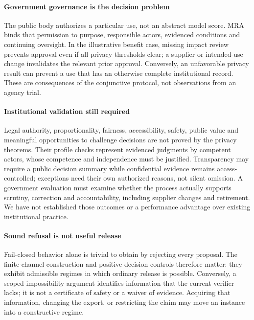 \documentclass[conference,compsoc]{IEEEtran}
\begin{document}
\paragraph{Government governance is the decision problem}
The public body authorizes a particular use, not an abstract model score.
MRA binds that permission to purpose, responsible actors, evidenced
conditions and continuing oversight. In the illustrative benefit case,
missing impact review prevents approval even if all privacy thresholds
clear; a supplier or intended-use change invalidates the relevant prior
approval. Conversely, an unfavorable privacy result can prevent a use that
has an otherwise complete institutional record. These are consequences of
the conjunctive protocol, not observations from an agency trial.

\paragraph{Institutional validation still required}
Legal authority, proportionality, fairness, accessibility, safety, public
value and meaningful opportunities to challenge decisions are not proved
by the privacy theorems. Their profile checks represent evidenced judgments
by competent actors, whose competence and independence must be justified.
Transparency may require a public decision summary while confidential
evidence remains access-controlled; exceptions need their own authorized
reasons, not silent omission. A government evaluation must examine whether
the process actually supports scrutiny, correction and accountability,
including supplier changes and retirement. We have not established those
outcomes or a performance advantage over existing institutional practice.

\paragraph{Sound refusal is not useful release}
Fail-closed behavior alone is trivial to obtain by rejecting every proposal.
The finite-channel construction and positive decision controls therefore
matter: they exhibit admissible regimes in which ordinary release is
possible. Conversely, a scoped impossibility argument identifies information
that the current verifier lacks; it is not a certificate of safety or a
waiver of evidence. Acquiring that information, changing the export, or
restricting the claim may move an instance into a constructive regime.
\end{document}
